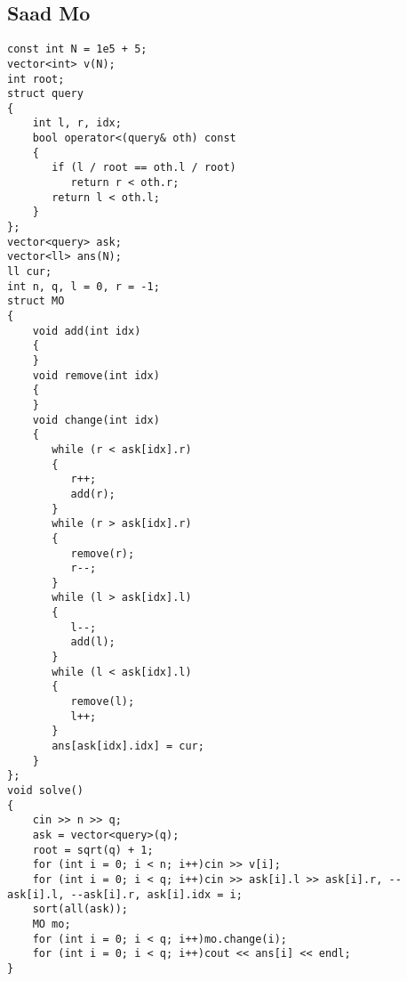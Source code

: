 \documentclass{article}
\begin{document}
\subsection{Saad Mo}
\begin{verbatim}
const int N = 1e5 + 5;  
vector<int> v(N);  
int root;  
struct query  
{  
    int l, r, idx;  
    bool operator<(query& oth) const  
    {  
       if (l / root == oth.l / root)  
          return r < oth.r;  
       return l < oth.l;  
    }  
};  
vector<query> ask;  
vector<ll> ans(N);  
ll cur;  
int n, q, l = 0, r = -1;  
struct MO  
{  
    void add(int idx)  
    {  
    }  
    void remove(int idx)  
    {  
    }  
    void change(int idx)  
    {  
       while (r < ask[idx].r)  
       {  
          r++;  
          add(r);  
       }  
       while (r > ask[idx].r)  
       {  
          remove(r);  
          r--;  
       }  
       while (l > ask[idx].l)  
       {  
          l--;  
          add(l);  
       }  
       while (l < ask[idx].l)  
       {  
          remove(l);  
          l++;  
       }  
       ans[ask[idx].idx] = cur;  
    }  
};  
void solve()  
{  
    cin >> n >> q;  
    ask = vector<query>(q);  
    root = sqrt(q) + 1;  
    for (int i = 0; i < n; i++)cin >> v[i];  
    for (int i = 0; i < q; i++)cin >> ask[i].l >> ask[i].r, --ask[i].l, --ask[i].r, ask[i].idx = i;  
    sort(all(ask));  
    MO mo;  
    for (int i = 0; i < q; i++)mo.change(i);  
    for (int i = 0; i < q; i++)cout << ans[i] << endl;  
}
\end{verbatim}
\end{document}
